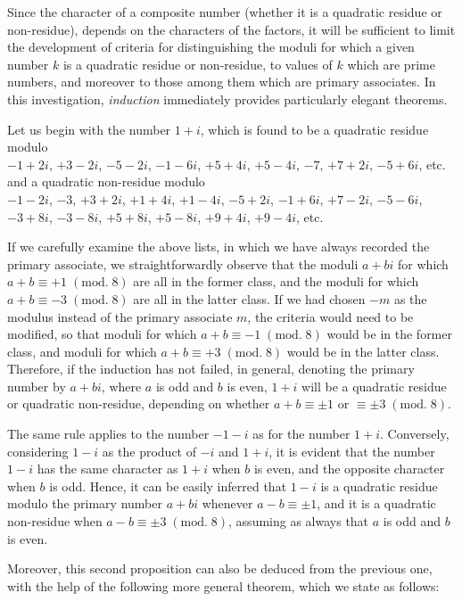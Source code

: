 \documentclass[twoside,12pt]{memoir}
\renewcommand{\pmod}[1]{\;(\textrm{mod.}\;#1)}
\begin{document}
Since the character of a composite number (whether it is a quadratic residue or non-residue), depends on the characters of the factors, it will be sufficient to limit the development of criteria for distinguishing the moduli for which a given number \(k\) is a quadratic residue or non-residue, to values of \(k\) which are prime numbers, and moreover to those among them which are primary associates. In this investigation, \textit{induction} immediately provides particularly elegant theorems.
%

Let us begin with the number \(1+i\), which is found to be a quadratic residue modulo\\
\(-1+2 i\), \(+3-2 i\), \(-5-2 i\), \(-1-6 i\), \(+5+4 i\), \(+5-4 i\), \(-7\), \(+7+2 i\), \(-5+6 i\), etc.\\
and a quadratic non-residue modulo\\
\(-1-2 i\), \(-3\), \(+3+2 i\), \(+1+4 i\), \(+1-4 i\), \(-5+2 i\), \(-1+6 i\), \(+7-2 i\), \(-5-6 i\), \(-3+8 i\), \(-3-8 i\), \(+5+8 i\), \(+5-8 i\), \(+9+4 i\), \(+9-4 i\), etc.
%

If we carefully examine the above lists, in which we have always recorded the primary associate, we straightforwardly observe that the moduli \(a+bi\) for which \(a+b \equiv +1 \pmod{8}\) are all in the former class, and the moduli for which \(a+b \equiv -3 \pmod{8}\) are all in the latter class. If we had chosen \(-m\) as the modulus instead of the primary associate \(m\), the criteria would need to be modified, so that moduli for which \(a+b \equiv -1\pmod{8}\) would be in the former class, and moduli for which \(a+b \equiv +3 \pmod{8}\) would be in the latter class. Therefore, if the induction has not failed, in general, denoting the primary number by \(a+bi\), where \(a\) is odd and \(b\) is even, \(1+i\) will be a quadratic residue or quadratic non-residue, depending on whether \(a+b \equiv \pm 1\) or \(\equiv \pm 3 \pmod{8}\).
%

The same rule applies to the number \(-1-i\) as for the number \(1+i\). Conversely, considering \(1-i\) as the product of \(-i\) and \(1+i\), it is evident that the number \(1-i\) has the same character as \(1+i\) when \(b\) is even, and the opposite character when \(b\) is odd. Hence, it can be easily inferred that \(1-i\) is a quadratic residue modulo the primary number \(a+b i\) whenever \(a-b \equiv \pm 1\), and it is a quadratic non-residue when \(a-b \equiv \pm 3\pmod{8}\), assuming as always that \(a\) is odd and \(b\) is even.
%

Moreover, this second proposition can also be deduced from the previous one, with the help of the following more general theorem, which we state as follows:
\end{document}
